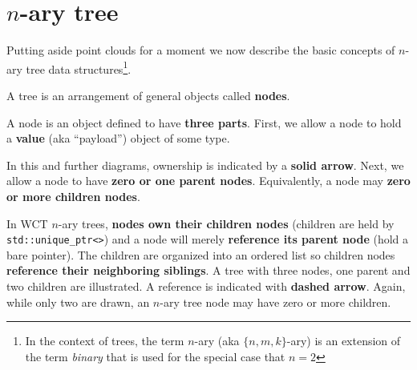 \documentclass{article}
\begin{document}
\section{$n$-ary tree}

Putting aside point clouds for a moment we now describe the basic concepts of $n$-ary tree data structures\footnote{In the context of trees, the term $n$-ary (aka $\{n,m,k\}$-ary) is an extension of the term \textit{binary} that is used for the special case that $n=2$}.  

A tree is an arrangement of general objects called \textbf{nodes}.

\begin{center}
\end{center}
A node is an object defined to have \textbf{three parts}.  First, we allow a node to hold a \textbf{value} (aka ``payload'') object of some type.  

\begin{center}
\end{center}
In this and further diagrams, ownership is indicated by a \textbf{solid arrow}.
Next, we allow a node to have \textbf{zero or one parent nodes}.  Equivalently, a node may \textbf{zero or more children nodes}.

In WCT $n$-ary trees, \textbf{nodes own their children nodes} (children are held by \verb|std::unique_ptr<>|) and a node will merely \textbf{reference its parent node} (hold a bare pointer). 
The children are organized into an ordered list so children nodes \textbf{reference their neighboring siblings}.
A tree with three nodes, one parent and two children are illustrated. 
A reference is indicated with \textbf{dashed arrow}.
Again, while only two are drawn, an $n$-ary tree node may have zero or more children.
\end{document}
